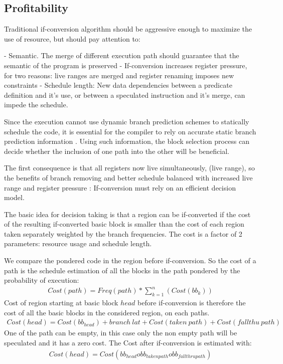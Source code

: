 \subsection{Profitability}

Traditional if-conversion algorithm should be aggressive enough to maximize the use of resource, but should pay attention to:

- Semantic. The merge of different execution path should guarantee that the semantic of the program is preserved
- If-conversion increases register pressure, for two reasons: live ranges are merged and register renaming imposes new constraints
- Schedule length: New data dependencies between a predicate definition and it's use, or between a speculated instruction and it's merge, can impede the schedule.

Since the execution cannot use dynamic branch prediction schemes to statically schedule the code, it is essential for the compiler to rely on accurate static branch prediction information \cite{Fisher:1992:PCB:143371.143493}. Using such information, the block selection process can decide whether the inclusion of one path into the other will be beneficial. 

The first consequence is that all registers now live simultaneously, (live range), so the benefits of branch removing and better schedule balanced with increased live range and register pressure : If-conversion must rely on an efficient decision model.

The basic idea for decision taking is that a region can be if-converted if the cost of the resulting if-converted basic block is smaller than the cost of each region taken separately weighted by the branch frequencies. The cost is a factor of 2 parameters: resource usage and schedule length.

We compare the pondered code in the region before if-conversion. So the cost of a path is the schedule estimation of all the blocks in the path pondered by the probability of execution:
\begin{align}
Cost(path)=Freq(path)*\sum_{k=1}^n(Cost(bb_{k}))
\end{align}
Cost of region starting at basic block $head$ before if-conversion is therefore the cost of all the basic blocks in the considered region, on each paths.
\begin{align}
Cost(head)=Cost(bb_{head})+branch\:lat+Cost(taken\:path)+Cost(fallthu\:path)
\end{align}
One of the path can be empty, in this case only the non empty path will be speculated and it has a zero cost. The Cost after if-conversion is estimated with:
\begin{align}
Cost(head)=Cost(bb_{head} o bb_{taken path} o bb_{fallthru path})
\end{align}


